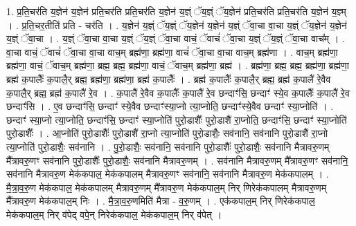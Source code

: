 \documentclass[17pt]{extarticle}
\begin{document}
1. प्र॒ति॒चर॑ति य॒ज्ञेन॑ य॒ज्ञेन॑ प्रति॒चर॑ति प्रति॒चर॑ति य॒ज्ञेन॑ य॒ज्ञ्ं ॅय॒ज्ञ्ं ॅय॒ज्ञेन॑ प्रति॒चर॑ति प्रति॒चर॑ति य॒ज्ञेन॑ य॒ज्ञ्म् । . प्र॒ति॒चर॒तीति॑ प्रति - चर॑ति । . य॒ज्ञेन॑ य॒ज्ञ्ं ॅय॒ज्ञ्ं ॅय॒ज्ञेन॑ य॒ज्ञेन॑ य॒ज्ञ्ं ॅवा॒चा वा॒चा य॒ज्ञ्ं ॅय॒ज्ञेन॑ य॒ज्ञेन॑ य॒ज्ञ्ं ॅवा॒चा । . य॒ज्ञ्ं ॅवा॒चा वा॒चा य॒ज्ञ्ं ॅय॒ज्ञ्ं ॅवा॒चा वाचं॒ ॅवाचं॑ ॅवा॒चा य॒ज्ञ्ं ॅय॒ज्ञ्ं ॅवा॒चा वाच᳚म् । . वा॒चा वाचं॒ ॅवाचं॑ ॅवा॒चा वा॒चा वाच॒म् ब्रह्म॑णा॒ ब्रह्म॑णा॒ वाचं॑ ॅवा॒चा वा॒चा वाच॒म् ब्रह्म॑णा । . वाच॒म् ब्रह्म॑णा॒ ब्रह्म॑णा॒ वाचं॒ ॅवाच॒म् ब्रह्म॑णा॒ ब्रह्म॒ ब्रह्म॒ ब्रह्म॑णा॒ वाचं॒ ॅवाच॒म् ब्रह्म॑णा॒ ब्रह्म॑ । . ब्रह्म॑णा॒ ब्रह्म॒ ब्रह्म॒ ब्रह्म॑णा॒ ब्रह्म॑णा॒ ब्रह्म॑ क॒पालैः᳚ क॒पालै॒र् ब्रह्म॒ ब्रह्म॑णा॒ ब्रह्म॑णा॒ ब्रह्म॑ क॒पालैः᳚ । . ब्रह्म॑ क॒पालैः᳚ क॒पालै॒र् ब्रह्म॒ ब्रह्म॑ क॒पालै॑ रे॒वैव क॒पालै॒र् ब्रह्म॒ ब्रह्म॑ क॒पालै॑ रे॒व । . क॒पालै॑ रे॒वैव क॒पालैः᳚ क॒पालै॑ रे॒व छन्दाꣳ॑सि॒ छन्दाꣳ॑ स्ये॒व क॒पालैः᳚ क॒पालै॑ रे॒व छन्दाꣳ॑सि । . ए॒व छन्दाꣳ॑सि॒ छन्दाꣳ॑ स्ये॒वैव छन्दाꣳ॑स्या॒प्नो त्या॒प्नोति॒ छन्दाꣳ॑स्ये॒वैव छन्दाꣳ॑ स्या॒प्नोति॑ । . छन्दाꣳ॑ स्या॒प्नो त्या॒प्नोति॒ छन्दाꣳ॑सि॒ छन्दाꣳ॑ स्या॒प्नोति॑ पुरो॒डाशैः᳚ पुरो॒डाशै॑ रा॒प्नोति॒ छन्दाꣳ॑सि॒ छन्दाꣳ॑ स्या॒प्नोति॑ पुरो॒डाशैः᳚ । . आ॒प्नोति॑ पुरो॒डाशैः᳚ पुरो॒डाशै॑ रा॒प्नो त्या॒प्नोति॑ पुरो॒डाशैः॒ सव॑नानि॒ सव॑नानि पुरो॒डाशै॑ रा॒प्नो त्या॒प्नोति॑ पुरो॒डाशैः॒ सव॑नानि । . पु॒रो॒डाशैः॒ सव॑नानि॒ सव॑नानि पुरो॒डाशैः᳚ पुरो॒डाशैः॒ सव॑नानि मैत्रावरु॒णम् मै᳚त्रावरु॒णꣳ सव॑नानि पुरो॒डाशैः᳚ पुरो॒डाशैः॒ सव॑नानि मैत्रावरु॒णम् । . सव॑नानि मैत्रावरु॒णम् मै᳚त्रावरु॒णꣳ सव॑नानि॒ सव॑नानि मैत्रावरु॒ण मेक॑कपाल॒ मेक॑कपालम् मैत्रावरु॒णꣳ सव॑नानि॒ सव॑नानि मैत्रावरु॒ण मेक॑कपालम् । . मै॒त्रा॒व॒रु॒ण मेक॑कपाल॒ मेक॑कपालम् मैत्रावरु॒णम् मै᳚त्रावरु॒ण मेक॑कपाल॒म् निर् णिरेक॑कपालम् मैत्रावरु॒णम् 
मै᳚त्रावरु॒ण मेक॑कपाल॒म् निः । . मै॒त्रा॒व॒रु॒णमिति॑ मैत्रा - व॒रु॒णम् । . एक॑कपाल॒म् निर् णिरेक॑कपाल॒ मेक॑कपाल॒म् निर् व॑पेद् वपे॒न् निरेक॑कपाल॒ मेक॑कपाल॒म् निर् व॑पेत् । \newline
\end{document}
